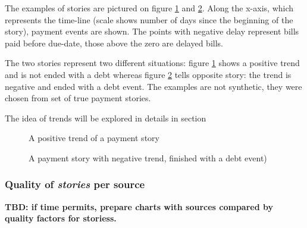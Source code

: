 \documentclass{article}
\begin{document}
\vspace{0.5cm}
\noindent{}
\vspace{0.5cm}

The examples of stories are pictured on figure \ref{fig:104_story_example_positive} and \ref{fig:105_story_example_negative}.
Along the x-axis, which represents the time-line (scale shows number of days since the beginning of the story), payment events are shown.
The points with negative delay represent bills paid before due-date, those above the zero are delayed bills.
\par
The two stories represent two different situations: figure \ref{fig:104_story_example_positive} shows a positive trend and is not ended with a debt whereas
figure \ref{fig:105_story_example_negative} tells opposite story: the trend is negative and ended with a debt event.
The examples are not synthetic, they were chosen from set of true payment stories.
\par
The idea of trends will be explored in details in section 

\begin{figure}[htbp!]
    \begin{center}
        
    \caption{A positive trend of a payment story}
    \label{fig:104_story_example_positive}
    \end{center}
\end{figure}

\begin{figure}[htbp!]
    \begin{center}
        
    \caption{A payment story with negative trend, finished with a debt event)}
    \label{fig:105_story_example_negative}
    \end{center}
\end{figure}

\subsubsection{Quality of \textit{stories} per source}

\textbf{TBD: if time permits, prepare charts with sources compared by quality factors for storiess.}
\end{document}
